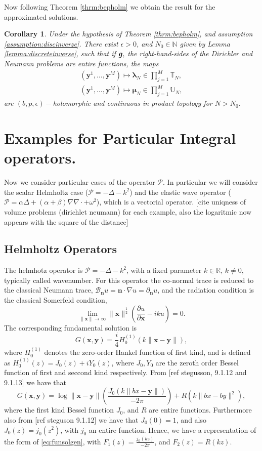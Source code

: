\documentclass{article}
\newtheorem{corollary}[theorem]{Corollary}
\newcommand{\todo}[1]{{\color{red}[#1]}}
\newcommand{\bmu} {\bm{\mu}}
\newcommand{\bg}{\bm{g}}
\newcommand{\IN}{{\mathbb N}}
\newcommand{\IR}{{\mathbb R}}
\newcommand{\IU}{{\mathbb U}}
\newcommand{\IT}{{\mathbb T}}
\newcommand{\cP}{\mathcal{P}}
\newcommand{\bla}{\boldsymbol \lambda}
\newcommand{\bn}{\bm{n}}
\newcommand{\bx}{\bm{x}}
\newcommand{\by}{\bm{y}}
\begin{document}
Now following Theorem \ref{thrm:bepholm} we obtain the result for the approximated solutions.

\begin{corollary}
Under the hypothesis of Theorem \ref{thrm:bepholm}, and assumption \ref{assumption:discinverze}. There exist $\epsilon >0$, and $N_0 \in \IN$ given by Lemma \ref{lemma:discreteinverse}, such that if $\bg, \bf$ the right-hand-sides of the Dirichler and Neumann problems are  entire functions, the maps 
\begin{align*}
(\by^1,\hdots,\by^M) \mapsto \bla_N \in  \prod_{j=1}^M \IT_N ,\\
(\by^1,\hdots,\by^M) \mapsto \bmu_N \in  \prod_{j=1}^M \IU_N ,
\end{align*}
are $(b,p,\epsilon)-$holomorphic and continuous in product topology for $N > N_0$. 
\end{corollary} 

\section{Examples for Particular Integral operators.}
Now we consider particular cases of the operator $\cP$. In particular we will consider the scalar Helmholtz case ($\cP  = -\Delta - k^2$) and the elastic wave operator 
($\cP = 
\alpha \Delta + (\alpha +\beta) \nabla \nabla \cdot  + \omega^2
$), which is a vectorial operator.
\todo{cite uniqness of volume problems (dirichlet neumann) for each example, also the logaritmic now appears with the square of the distance}
\subsection{Helmholtz Operators}
The helmhotz operator is $\cP = -\Delta -k^2$, with a fixed parameter $k \in \IR$, $k\neq 0$, typically called wavenumber. For this operator the co-normal trace is reduced to the classical Neumann trace, $\mathbf{\mathcal{B}}_{\bn}u = \bn \cdot \nabla u  = \partial_{\bn} u$, and the radiation condition is the classical Somerfeld condition, 
$$
\lim_{\|\bx\| \rightarrow \infty}
\| \bx \|^{\frac{1}{2}}\left( \frac{\partial u}{\partial \bx}-i k u\right)=0.
$$
The corresponding fundamental solution is
$$
G(\bx,\by) = \frac{i}{4}H^{(1)}_0(k \| \bx-\by\|),
$$
where $H^{(1)}_0$ denotes the zero-order Hankel function of first kind, and is defined as $H^{(1)}_0(z) = J_0(z) + i Y_0(z)$, where $J_0, Y_0$ are the zeroth order Bessel function of first and seccond kind respectively. From \todo{ref stegusson, 9.1.12 and 9.1.13} we have that 
$$
G(\bx,\by) = \log\|\bx-\by\|\left(\frac{J_0(k \|bx -\by\|)}{-2\pi}\right)+ R(k\|bx-by\|^2),
$$
where the first kind Bessel function $J_0$, and $R$ are entire functions.
Furthermore also from \todo{ref steguson 9.1.12} we have that $J_0(0) = 1$, and also $J_0(z) = j_0(z^2)$, with $j_0$ an entire function.  Hence, we have a representation of the form of \eqref{eq:funsolgen}, with $F_1(z) = \frac{j_0(k z)}{-2\pi}$, and $F_2(z) = R(k z)$.
\end{document}
